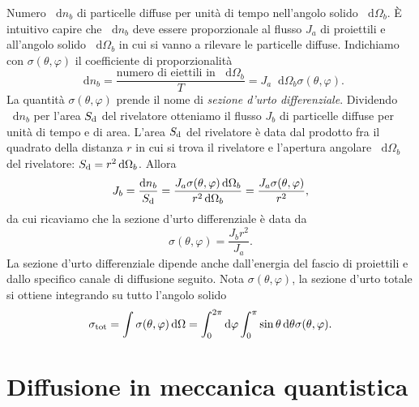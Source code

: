 \documentclass[a4paper,fleqn,twoside,12pt]{article}
\renewcommand{\phi}{\varphi}
\newcommand*{\dd}{\mathop{}\!\mathrm{d}} %
\begin{document}
Numero $\dd n_{b}$ di particelle diffuse per unità di tempo nell'angolo solido
$\dd\Omega_{b}$.  È intuitivo capire che $\dd n_{b}$ deve essere proporzionale
al flusso $J_{a}$ di proiettili e all'angolo solido $\dd\Omega_{b}$ in cui si
vanno a rilevare le particelle diffuse.  Indichiamo con $\sigma(\theta,\phi)$ il
coefficiente di proporzionalità
\begin{equation}
  \dd n_{b} = \frac{\text{numero di eiettili in $\dd\Omega_{b}$}}{T} = J_{a}
  \dd\Omega_{b} \sigma(\theta,\phi).
\end{equation}
La quantità $\sigma(\theta,\phi)$ prende il nome di
\emph{sezione d'urto differenziale}.  Dividendo $\dd n_{b}$ per l'area
$S_{\textup{d}}$ del rivelatore otteniamo il flusso $J_{b}$ di particelle
diffuse per unità di tempo e di area.  L'area $S_{\textup{d}}$ del rivelatore è
data dal prodotto fra il quadrato della distanza $r$ in cui si trova il
rivelatore e l'apertura angolare $\dd\Omega_{b}$ del rivelatore:
$S_{\textup{d}} = r^{2}\dd\Omega_{b}$.  Allora
\begin{equation}
  J_{b} = \frac{\dd n_{b}}{S_{\textup{d}}} = \frac{J_{a} \sigma(\theta,\phi)
    \dd\Omega_{b}}{r^{2} \dd\Omega_{b}} = \frac{J_{a}
    \sigma(\theta,\phi)}{r^{2}},
\end{equation}
da cui ricaviamo che la sezione d'urto differenziale è data da
\begin{equation}
  \label{eq:sez-urto}
  \sigma(\theta,\phi) = \frac{J_{b}r^{2}}{J_{a}}.
\end{equation}
La sezione d'urto differenziale dipende anche dall'energia del fascio di
proiettili e dallo specifico canale di diffusione seguito.  Nota
$\sigma(\theta,\phi)$, la sezione d'urto totale si ottiene integrando su tutto
l'angolo solido
\begin{equation}
  \sigma_{\textup{tot}} = \int \sigma(\theta,\phi) \dd\Omega = \int_{0}^{2\pi}
  \dd \phi \int_{0}^{\pi} \sin \theta \dd\theta \sigma(\theta,\phi).
\end{equation}


\section{Diffusione in meccanica quantistica}
\label{sec:meccanica-quantistica}
\end{document}
